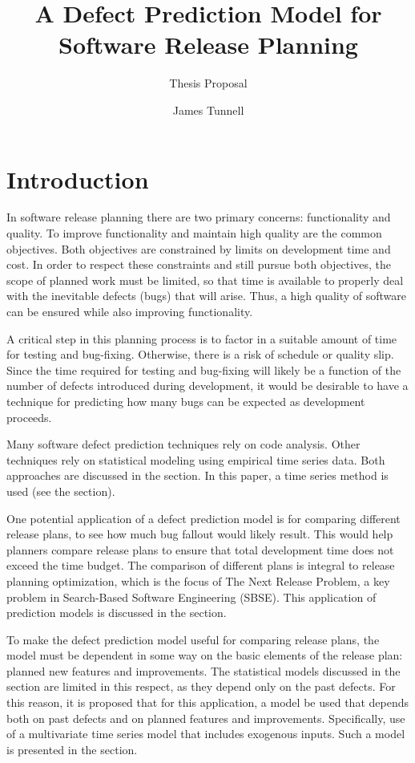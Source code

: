 \documentclass[a4paper]{scrartcl}
\begin{document}
\title{A Defect Prediction Model for Software Release Planning}
\subtitle{Thesis Proposal}
\author{James Tunnell}
\maketitle

\section*{Introduction}
In software release planning there are two primary concerns: functionality and quality. To improve functionality and maintain high quality are the common objectives. Both objectives are constrained by limits on development time and cost. In order to respect these constraints and still pursue both objectives, the scope of planned work must be limited, so that time is available to properly deal with the inevitable defects (bugs) that will arise. Thus, a high quality of software can be ensured while also improving functionality.

A critical step in this planning process is to factor in a suitable amount of time for testing and bug-fixing. Otherwise, there is a risk of schedule or quality slip. Since the time required for testing and bug-fixing will likely be a function of the number of defects introduced during development, it would be desirable to have a technique for predicting how many bugs can be expected as development proceeds.

Many software defect prediction techniques rely on code analysis. Other techniques rely on statistical modeling using empirical time series data. Both approaches are discussed in the  section. In this paper, a time series method is used (see the  section).

One potential application of a defect prediction model is for comparing different release plans, to see how much bug fallout would likely result. This would help planners compare release plans to ensure that total development time does not exceed the time budget. The comparison of different plans is integral to release planning optimization, which is the focus of The Next Release Problem, a key problem in Search-Based Software Engineering (SBSE). This application of prediction models is discussed in the  section.

To make the defect prediction model useful for comparing release plans, the model must be dependent in some way on the basic elements of the release plan: planned new features and improvements. The statistical models discussed in the  section are limited in this respect, as they depend only on the past defects. For this reason, it is proposed that for this application, a model be used that depends both on past defects and on planned features and improvements. Specifically, use of a multivariate time series model that includes exogenous inputs. Such a model is presented in the  section.
\end{document}

